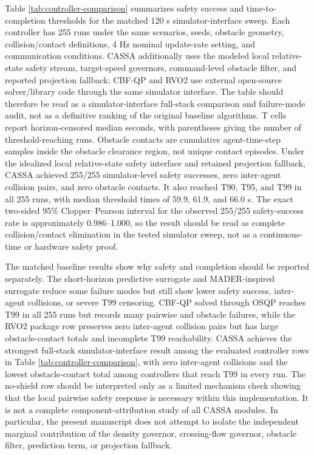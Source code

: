 \documentclass[11pt]{article}
\begin{document}
Table \ref{tab:controller-comparison} summarizes safety success and time-to-completion thresholds for the matched 120 s simulator-interface sweep. Each controller has 255 runs under the same scenarios, seeds, obstacle geometry, collision/contact definitions, 4 Hz nominal update-rate setting, and communication conditions. CASSA additionally uses the modeled local relative-state safety stream, target-speed governors, command-level obstacle filter, and reported projection fallback; CBF-QP and RVO2 use external open-source solver/library code through the same simulator interface. The table should therefore be read as a simulator-interface full-stack comparison and failure-mode audit, not as a definitive ranking of the original baseline algorithms. T cells report horizon-censored median seconds, with parentheses giving the number of threshold-reaching runs. Obstacle contacts are cumulative agent-time-step samples inside the obstacle clearance region, not unique contact episodes. Under the idealized local relative-state safety interface and retained projection fallback, CASSA achieved 255/255 simulator-level safety successes, zero inter-agent collision pairs, and zero obstacle contacts. It also reached T90, T95, and T99 in all 255 runs, with median threshold times of 59.9, 61.9, and 66.0 s. The exact two-sided 95\% Clopper--Pearson interval for the observed 255/255 safety-success rate is approximately 0.986--1.000, so the result should be read as complete collision/contact elimination in the tested simulator sweep, not as a continuous-time or hardware safety proof.

The matched baseline results show why safety and completion should be reported separately. The short-horizon predictive surrogate and MADER-inspired surrogate reduce some failure modes but still show lower safety success, inter-agent collisions, or severe T99 censoring. CBF-QP solved through OSQP reaches T99 in all 255 runs but records many pairwise and obstacle failures, while the RVO2 package row preserves zero inter-agent collision pairs but has large obstacle-contact totals and incomplete T99 reachability. CASSA achieves the strongest full-stack simulator-interface result among the evaluated controller rows in Table \ref{tab:controller-comparison}, with zero inter-agent collisions and the lowest obstacle-contact total among controllers that reach T99 in every run. The no-shield row should be interpreted only as a limited mechanism check showing that the local pairwise safety response is necessary within this implementation. It is not a complete component-attribution study of all CASSA modules. In particular, the present manuscript does not attempt to isolate the independent marginal contribution of the density governor, crossing-flow governor, obstacle filter, prediction term, or projection fallback.
\end{document}
